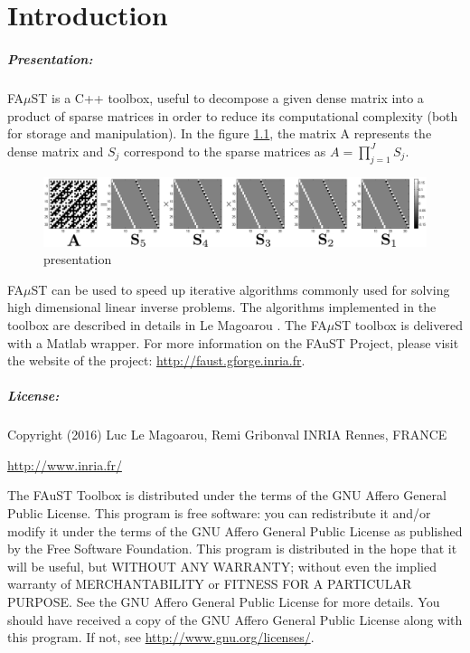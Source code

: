 \chapter{Introduction}\label{sec:intro}

\paragraph{Presentation:}FA$\mu$ST is a C++ toolbox, useful to decompose a given dense matrix into a product of sparse matrices in order to reduce its computational complexity (both for storage and manipulation). In the figure \ref{fig:presentation}, the matrix A represents the dense matrix and $S_j$ correspond to the sparse matrices as $A=\prod_{j=1}^J S_j$.

\begin{figure}[!h] %
\centering
\includegraphics[scale=0.5]{images/hadamard32_bw.pdf}
\caption{presentation}
\label{fig:presentation}
\end{figure}

FA$\mu$ST can be used to speed up iterative algorithms commonly used for solving high dimensional linear inverse problems. The algorithms implemented in the toolbox are described in details in Le Magoarou \cite{LeMagoarou2016}.
The FA$\mu$ST toolbox is delivered with a Matlab wrapper. 
For more information on the FAuST Project, please visit the website of the project: \url{http://faust.gforge.inria.fr}.



\paragraph{License:}Copyright (2016) Luc Le Magoarou, Remi Gribonval INRIA Rennes, FRANCE 
\begin{center} 
\url{http://www.inria.fr/}
\end{center}
The FAuST Toolbox is distributed under the terms of the GNU Affero General Public License. This program is free software: you can redistribute it and/or modify it under the terms of the GNU Affero General Public License as published by the Free Software Foundation. This program is distributed in the hope that it will be useful, but WITHOUT ANY WARRANTY; without even the implied warranty of MERCHANTABILITY or FITNESS FOR A PARTICULAR PURPOSE.  See the GNU Affero General Public License for more details. You should have received a copy of the GNU Affero General Public License along with this program.  If not, see \url{http://www.gnu.org/licenses/}.


